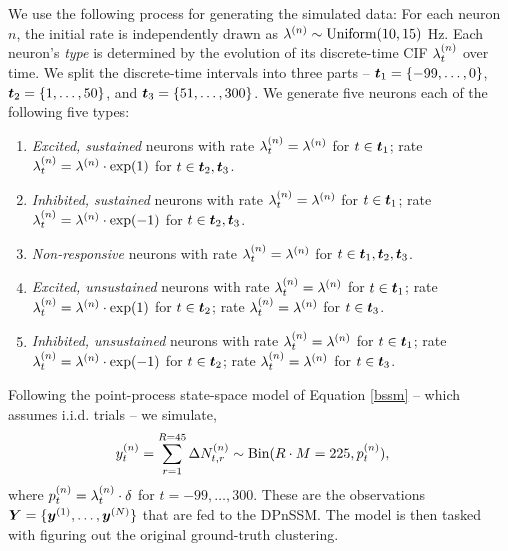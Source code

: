 \documentclass[twoside]{article}
\begin{document}
We use the following process for generating the simulated data:  For each neuron $n$, the initial rate is independently drawn as $\idx \lambda n \sim \text{Uniform}(10, 15)$ Hz.  Each neuron's \emph{type} is determined by the evolution of its discrete-time CIF  $\idx[t] \lambda n $ over time.  We split the discrete-time intervals into three parts -- $\bd t_1 = \{-99, \ldots, 0\}$, $\bd t_2 = \{1, \ldots, 50\}$, and $\bd t_3 = \{51, \ldots, 300\}$.  We generate five neurons each of the following five types: 
\begin{enumerate}
\item \emph{Excited, sustained} neurons with rate $\idx[t] \lambda n = \idx \lambda n$ for $t \in \bd t_1$; rate $\idx[t] \lambda n = \idx \lambda n \cdot \exp(1)$ for $t \in \bd t_2, \bd t_3$.
\item \emph{Inhibited, sustained} neurons with rate $\idx[t] \lambda n = \idx \lambda n$ for $t \in \bd t_1$; rate $\idx[t] \lambda n = \idx \lambda n \cdot \exp(-1)$ for $t \in \bd t_2, \bd t_3$.
\item \emph{Non-responsive} neurons with rate $\idx[t] \lambda n = \idx \lambda n$ for $t \in \bd t_1, \bd t_2, \bd t_3$.
\item \emph{Excited, unsustained} neurons with rate $\idx[t] \lambda n = \idx \lambda n$ for $t \in \bd t_1$; rate $\idx[t] \lambda n = \idx \lambda n \cdot \exp(1)$ for $t \in \bd t_2$; rate $\idx[t] \lambda n = \idx \lambda n$ for $t \in \bd t_3$.
\item \emph{Inhibited, unsustained} neurons with rate $\idx[t] \lambda n = \idx \lambda n$ for $t \in \bd t_1$; rate $\idx[t] \lambda n = \idx \lambda n \cdot \exp(-1)$ for $t \in \bd t_2$; rate $\idx[t] \lambda n = \idx \lambda n$ for $t \in \bd t_3$.
\end{enumerate}
Following the point-process state-space model of Equation \ref{bssm} -- which assumes i.i.d. trials -- we simulate, 
\begin{align}
\idx[t] y n = \sum_{r=1}^{R=45} \Delta \idx[t, r] N n &\sim \text{Bin}(R \cdot M = 225, \idx[t] p n),
\end{align}
where $\idx[t] p n = \idx[t] \lambda n \cdot \delta$ for $t = -99, \ldots, 300$.  These are the observations $\bd Y = \{\bidx y 1, \ldots, \bidx y N\}$ that are fed to the DPnSSM.  The model is then tasked with figuring out the original ground-truth clustering.
\end{document}
